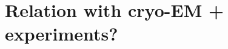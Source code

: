 \documentclass[12pt]{article}
\newcommand{\1}{\mathbf{1}}
\theoremstyle{plain}
\theoremstyle{definition}
\theoremstyle{remark}
\theoremstyle{plain}
\theoremstyle{remark}
\theoremstyle{plain}
\theoremstyle{plain}
\theoremstyle{plain}
\numberwithin{equation}{section}
\begin{document}
\section{Relation with cryo-EM + experiments?}
%
%
%
%
\end{document}
